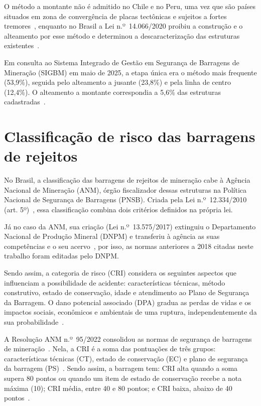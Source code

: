 O método a montante não é admitido no Chile e no Peru, uma vez que são países situados
em zona de convergência de placas tectônicas e sujeitos a fortes
tremores~\cite[p.~60]{thome2018}, enquanto no Brasil a Lei n.º~14.066/2020
proibiu a construção e o alteamento por esse método e determinou a
descaracterização das estruturas existentes~\cite{brasil2020lei14066}.

Em consulta ao Sistema Integrado de Gestão em Segurança de Barragens de
Mineração
(SIGBM) em maio de 2025, a etapa única era o método mais frequente
(53,9\%), seguida pelo alteamento a jusante (23,8\%) e pela linha de
centro (12,4\%). O alteamento a montante correspondia a 5,6\% das
estruturas cadastradas~\cite{anmsistema2020}.

\section{Classificação de risco das barragens de rejeitos}
\label{sec:classificacao_risco}

No Brasil, a classificação das barragens de rejeitos de mineração cabe à
Agência Nacional de Mineração (ANM), órgão fiscalizador dessas
estruturas na Política Nacional de Segurança de Barragens (PNSB). Criada pela Lei n.º~12.334/2010 (art. 5º)~\cite{brasil2010pnsb}, essa classificação combina dois critérios definidos na própria lei.

Já no caso da ANM, sua criação (Lei n.º~13.575/2017) extinguiu o Departamento
Nacional de Produção Mineral (DNPM) e transferiu à agência as suas
competências e o seu acervo~\cite{brasil2017lei13575}, por isso, as normas anteriores a 2018 citadas neste trabalho foram editadas pelo DNPM.

Sendo assim, a categoria de risco (CRI) considera os seguintes aspectos que influenciam a
possibilidade de acidente: características técnicas, método
construtivo, estado de conservação, idade e atendimento ao Plano de
Segurança da Barragem. O dano potencial associado (DPA) gradua as
perdas de vidas e os impactos sociais, econômicos e ambientais de uma
ruptura, independentemente da sua probabilidade~\cite{brasil2010pnsb, brasil2020lei14066}.

A Resolução ANM n.º~95/2022 consolidou as normas de segurança de
barragens de mineração~\cite{anm2022resolucao95}. Nela, a CRI é a soma
das pontuações de três grupos: características técnicas (CT), estado de
conservação (EC) e plano de segurança da barragem (PS)~\cite{anm2022faqres95}.
Sendo assim, a barragem tem: CRI alta quando a soma supera 80 pontos ou quando um
item de estado de conservação recebe a nota máxima (10); CRI média,
entre 40 e 80 pontos; e CRI baixa, abaixo de 40 pontos~\cite{anm2022faqres95}.

